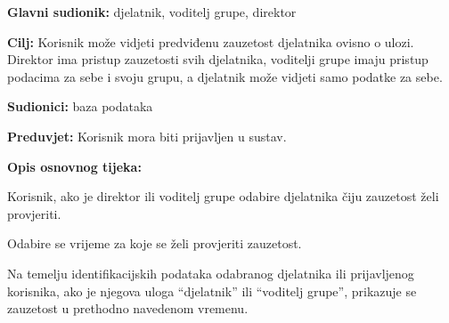 			\begin{packed_item}
				\item \textbf{Glavni sudionik: } djelatnik, voditelj grupe, direktor
				\item  \textbf{Cilj:} Korisnik može vidjeti predviđenu zauzetost djelatnika ovisno o ulozi. Direktor ima pristup zauzetosti svih djelatnika, voditelji grupe imaju pristup podacima za sebe i svoju grupu, a djelatnik može vidjeti samo podatke za sebe.
				\item  \textbf{Sudionici:} baza podataka
				\item  \textbf{Preduvjet:} Korisnik mora biti prijavljen u sustav.
				\item  \textbf{Opis osnovnog tijeka:}
				\item[] \begin{packed_enum}
					\item Korisnik, ako je direktor ili voditelj grupe odabire djelatnika čiju zauzetost želi provjeriti. 
					\item Odabire se vrijeme za koje se želi provjeriti zauzetost. 
					\item Na temelju identifikacijskih podataka odabranog djelatnika ili prijavljenog korisnika, ako je njegova uloga “djelatnik” ili “voditelj grupe”, prikazuje se zauzetost u prethodno navedenom vremenu.
				\end{packed_enum}
			\end{packed_item}
